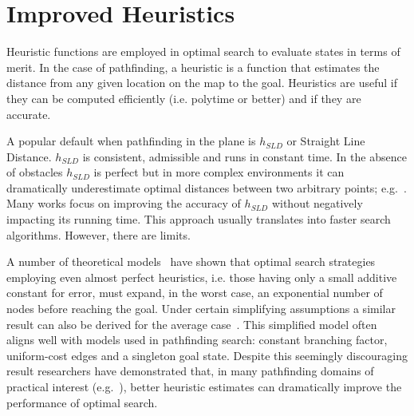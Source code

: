 \section{Improved Heuristics}
\label{cha::lit::heuristics}

%
Heuristic functions are employed in optimal search to evaluate states in terms of merit. In the case
of pathfinding, a heuristic is a function that estimates the distance from any given location on the
map to the goal. Heuristics are useful if they can be computed efficiently (i.e.  polytime or
better) and if they are accurate.

A popular default when pathfinding in the plane is $h_{SLD}$ or Straight Line Distance.
$h_{SLD}$ is consistent, admissible and runs in constant time. In the absence of obstacles
$h_{SLD}$ is perfect but in more complex environments it can dramatically underestimate 
optimal distances between two arbitrary points; e.g.~\citep{goldberg05}.
Many works focus on improving the accuracy of $h_{SLD}$ without negatively impacting its running 
time. This approach usually translates into faster search algorithms. However, there are limits.

A number of theoretical models~\citep{pohl77,helmert08} have shown that optimal search strategies
employing even almost perfect heuristics, i.e. those having only a small additive constant for
error, must expand, in the worst case, an exponential number of nodes before reaching the goal.
Under certain simplifying assumptions a similar result can also be derived for the average
case~\citep{pearl84}.  This simplified model often aligns well with models used in pathfinding
search: constant branching factor, uniform-cost edges and a singleton goal state.  Despite this
seemingly discouraging result researchers have demonstrated that, in many pathfinding domains of
practical interest (e.g.~\citep{sturtevant12}), better heuristic estimates can dramatically improve 
the performance of optimal search.

